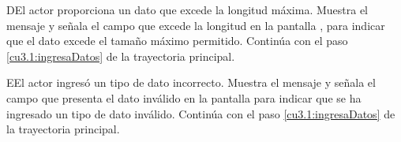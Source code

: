  \begin{UCtrayectoriaA}{D}{El actor proporciona un dato que excede la longitud máxima.}
    \UCpaso[\UCsist] Muestra el mensaje  y señala el campo que excede la 
    longitud en la pantalla , para indicar que el dato excede el tamaño máximo permitido.
    \UCpaso[] Continúa con el paso \ref{cu3.1:ingresaDatos} de la trayectoria principal.
 \end{UCtrayectoriaA}
 
 \begin{UCtrayectoriaA}{E}{El actor ingresó un tipo de dato incorrecto.}
    \UCpaso[\UCsist] Muestra el mensaje  y señala el campo que presenta el dato inválido en la 
    pantalla  para indicar que se ha ingresado un tipo de dato inválido.
    \UCpaso[] Continúa con el paso \ref{cu3.1:ingresaDatos} de la trayectoria principal.
 \end{UCtrayectoriaA}
 